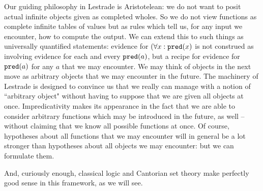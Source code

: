 \documentclass[12pt]{article}
\begin{document}
Our guiding philosophy in Lestrade is Aristotelean:  we do not want to posit actual infinite objects given as completed wholes.
So we do not view functions as complete infinite tables of values but as rules which tell us, for any input we encounter, how to compute the output.  We can extend this to such things as universally quantified statements:  evidence for $(\forall x:{\tt pred}(x)$ is not construed as involving evidence for each and every ${\tt pred}(a)$, but a recipe for evidence for ${\tt pred}(a)$ for any $a$ that we may encounter.  We may think of objects in the next move as arbitrary objects that we may encounter in the future.  The machinery of Lestrade is designed to convince us that we really can manage with a notion of ``arbitrary object" without having to suppose that we are given all objects at once.  Impredicativity makes its appearance in the fact that we are able to consider arbitrary functions which may be introduced in the future, as well -- without claiming that we know all possible functions at once.  Of course, hypotheses about all functions that we may encounter will in general be a lot stronger than hypotheses about all objects we may encounter:  but we can formulate them.

And, curiously enough, classical logic and Cantorian set theory make perfectly good sense in this framework, as we will see.
\end{document}
